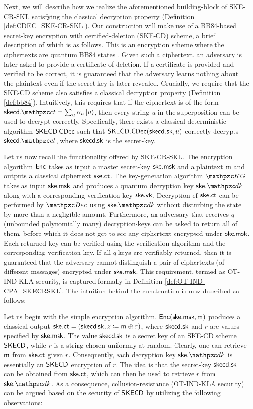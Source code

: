 Next, we will describe how we realize the aforementioned
building-block of SKE-CR-SKL satisfying the classical decryption
property (Definition \ref{def:CDEC_SKE-CR-SKL}). Our construction will
make use of a BB84-based secret-key encryption with certified-deletion
(SKE-CD) scheme, a brief description of which is as follows. This is
an encryption scheme where the ciphertexts are quantum BB84 states
\cite{wiesner1983conjugate,BB84}.  Given such a ciphertext, an
adversary is later asked to provide a certificate of deletion. If a
certificate is provided and verified to be correct, it is guaranteed
that the adversary learns nothing about the plaintext even if the
secret-key is later revealed.  Crucially, we require that
the SKE-CD scheme also satisfies a classical decryption property
(Definition \ref{def:bb84}). Intuitively, this requires that if the ciphertext
is of the form $\skecd.\qct = \sum_u \alpha_u \ket{u}$, then every string $u$ in the
superposition can be used to decrypt correctly. Specifically, there
exists a classical deterministic algorithm $\mathsf{SKECD}.\mathsf{CDec}$ such that
$\mathsf{SKECD}.\mathsf{CDec}(\mathsf{skecd}.\mathsf{sk}, u)$ correctly decrypts $\skecd.\qct$, where
$\mathsf{skecd}.\mathsf{sk}$ is the secret-key.

Let us now recall the functionality offered by SKE-CR-SKL.
The encryption algorithm $\mathsf{Enc}$ takes as input a master secret-key
$\mathsf{ske}.\mathsf{msk}$
and a plaintext $\mathsf{m}$ and outputs a classical ciphertext
$\mathsf{ske}.\mathsf{ct}$. The
key-generation algorithm $\qKG$ takes as input $\mathsf{ske}.\mathsf{msk}$ and produces a
quantum decryption key $\ske.\qdk$ along with a corresponding
verification-key $\mathsf{ske}.\mathsf{vk}$. Decryption of $\mathsf{ske}.\mathsf{ct}$ can be performed by $\qDec$ using
$\ske.\qdk$ without disturbing the state by more than a negligible amount. Furthermore, an
adversary that receives $q$ (unbounded polynomially many)
decryption-keys can be asked to return all of them, before which it
does not get to see any ciphertext encrypted under $\mathsf{ske}.\mathsf{msk}$. Each
returned key can be verified using the verification algorithm and
the corresponding verification key. If all $q$ keys are
verifiably returned, then it is guaranteed that the adversary cannot
distinguish a pair of ciphertexts (of different messages) encrypted
under $\mathsf{ske}.\mathsf{msk}$. This requirement, termed as OT-IND-KLA security, is
captured formally in Definition \ref{def:OT-IND-CPA_SKECRSKL}. The
intuition behind the construction is now described as follows:

Let us begin with the simple encryption algorithm. $\mathsf{Enc}(\mathsf{ske}.\mathsf{msk}, \mathsf{m})$
produces a classical output $\mathsf{ske}.\mathsf{ct}= (\mathsf{skecd}.\mathsf{sk}, z \coloneqq \mathsf{m} \oplus r)$, where
$\mathsf{skecd}.\mathsf{sk}$ and $r$ are values specified by $\mathsf{ske}.\mathsf{msk}$. The value
$\mathsf{skecd}.\mathsf{sk}$ is a secret key of an SKE-CD scheme $\mathsf{SKECD}$, while $r$
is a string chosen uniformly at random. Clearly, one can retrieve
$\mathsf{m}$ from $\mathsf{ske}.\mathsf{ct}$ given $r$. Consequently, each decryption key
$\ske.\qdk$
is essentially an $\mathsf{SKECD}$ encryption of $r$.  The idea is that the
secret-key $\mathsf{skecd}.\mathsf{sk}$ can be obtained from $\mathsf{ske}.\mathsf{ct}$, which can then be
used to retrieve $r$ from $\ske.\qdk$. As a consequence,
collusion-resistance (OT-IND-KLA security) can be argued based on the
security of $\mathsf{SKECD}$ by utilizing the following observations:


